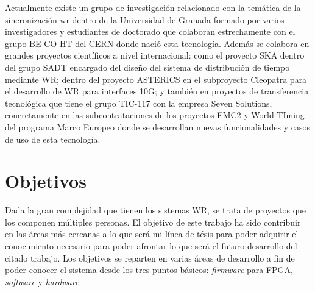 Actualmente existe un grupo de investigación relacionado con la temática de la 
sincronización \gls{wr} dentro de la Universidad de Granada formado por varios 
investigadores y estudiantes de doctorado que colaboran estrechamente con el 
grupo BE-CO-HT del CERN donde nació esta tecnología. Además se colabora en 
grandes proyectos científicos a nivel internacional: como el proyecto SKA 
\cite{website:ska} dentro del grupo SADT encargado del diseño del sistema de 
distribución de tiempo mediante WR; dentro del proyecto ASTERICS en el 
subproyecto Cleopatra para el desarrollo de WR para interfaces 10G; y también 
en proyectos de transferencia tecnológica que tiene el grupo TIC-117 con la 
empresa Seven Solutions, concretamente en las subcontrataciones de los 
proyectos EMC2 y World-TIming del programa Marco Europeo donde se desarrollan 
nuevas funcionalidades y casos de uso de esta tecnología. 

\section{Objetivos}

Dada la gran complejidad que tienen los sistemas WR, se trata de proyectos que 
los componen múltiples personas. El objetivo de este trabajo ha sido contribuir 
en las áreas más cercanas a lo que será mi línea de tésis para poder adquirir 
el conocimiento necesario para poder afrontar lo que será el futuro desarrollo 
del citado trabajo. Los objetivos se reparten en varias áreas de desarrollo a 
fin de poder conocer el sistema desde los tres puntos básicos: 
\textit{firmware} para FPGA, \textit{software} y \textit{hardware}.

